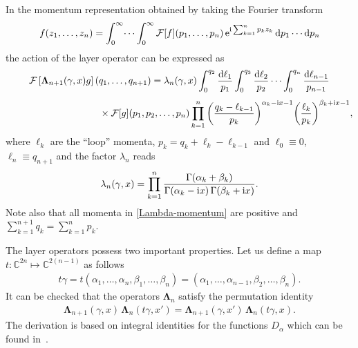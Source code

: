 \documentclass[pdftex]{sigma}%
\numberwithin{equation}{section}
\begin{document}
In the momentum representation obtained by taking the Fourier transform
\begin{gather*}
f(z_1,\dots, z_n)=\int_{0}^\infty\dots\int_0^\infty \mathcal{F}[f](p_1,\dots, p_n) \,{\rm e}^{{\rm i}\sum_{k=1}^n p_k z_k}\, {\rm d}p_1\cdots {\rm d}p_n
\end{gather*}
the action of the layer operator can be expressed as
\begin{gather}
\mathcal{F}\left[\boldsymbol\Lambda_{n+1}(\gamma,x) g\right](q_1,\dots,q_{n+1})
 =\lambda_n(\gamma,x)\int_{0}^{q_2} \frac{{\rm d}\ell_1}{p_1}\int_{0}^{q_3}
 \frac{{\rm d}\ell_2}{p_2} \cdots \int_{0}^{q_n} \frac{{\rm d}\ell_{n-1}}{p_{n-1}}\notag
 \\[1ex] \hphantom{\mathcal{F}\left[\boldsymbol\Lambda_{n+1}(\gamma,x) g\right] =\qquad}
 {}\times \mathcal{F}[g](p_1,p_2,\dots,p_n)\prod_{k=1}^{n}
 \bigg(\frac{q_k-\ell_{k-1}}{p_k}\bigg)^{\alpha_k-{\rm i}x-1}
 \bigg(\frac{\ell_k}{p_k}\bigg)^{\beta_k+{\rm i}x-1},\label{Lambda-momentum}
\end{gather}
where $\ell_k$ are the ``loop'' momenta, $ p_k= q_k+\ell_k-\ell_{k-1}$ and $ \ell_0\equiv 0$, $\ell_n\equiv q_{n+1}$ and the factor $\lambda_n$ reads
\begin{gather*}
\lambda_n(\gamma,x)=\prod_{k=1}^{n}\frac{\Gamma(\alpha_k+\beta_k)}{\Gamma(\alpha_k-{\rm i}x)\,\Gamma(\beta_k+{\rm i}x)}.
\end{gather*}
Note also that all momenta in \eqref{Lambda-momentum} are positive and $\sum_{k=1}^{n+1} q_k=\sum_{k=1}^n p_k$.


The layer operators possess two important properties. Let us define a map $t\colon \mathbb C^{2n} \mapsto \mathbb C^{2(n-1)}$ as follows
\begin{gather*}%
{t}\gamma= t(\alpha_1,\dots,\alpha_{n},\beta_{1},\dots,\beta_{n})= (\alpha_1,\dots,\alpha_{n-1},\beta_{2},\dots,\beta_{n}).
\end{gather*}
It can be checked that the operators $\boldsymbol \Lambda_n$ satisfy the permutation identity
 \begin{gather}\label{Lambda-permutation-identity}
\boldsymbol\Lambda_{n+1}(\gamma,x)\,\boldsymbol\Lambda_n(t\gamma,x')
 =\boldsymbol\Lambda_{n+1}(\gamma,x')\,\boldsymbol\Lambda_n(t\gamma,x).
\end{gather}
The derivation is based on integral identities for the functions $D_\alpha$ which can be found in~\cite{Derkachov:2002tf}.
\end{document}
